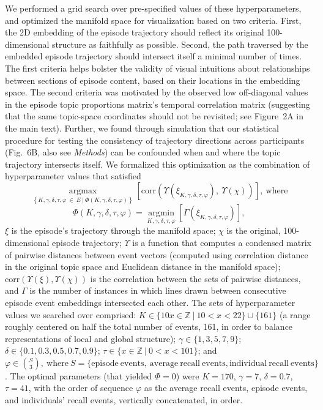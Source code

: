 \documentclass{article}
\newcommand{\argmax}{\mathop{\mathrm{argmax}}\limits}
\newcommand{\argmin}{\mathop{\mathrm{argmin}}\limits}
\newcommand{\topicprops}{2}
\newcommand{\trajectories}{6}
\begin{document}
We performed a grid search over pre-specified values of these hyperparameters, and optimized the manifold space for visualization based on two criteria. First, the 2D embedding of the episode trajectory should reflect its original 100-dimensional structure as faithfully as possible. Second, the path traversed by the embedded episode trajectory should intersect itself a minimal number of times.  The first criteria helps bolster the validity of visual intuitions about relationships between sections of episode content, based on their locations in the embedding space.  The second criteria was motivated by the observed low off-diagonal values in the episode topic proportions matrix's temporal correlation matrix (suggesting that the same topic-space coordinates should not be revisited; see Figure~\topicprops A in the main text).  Further, we found through simulation that our statistical procedure for testing the consistency of trajectory directions across participants (Fig.~\trajectories B, also see \textit{Methods}) can be confounded when and where the topic trajectory intersects itself.  We formalized this optimization as the combination of hyperparameter values that satisfied
\[
\argmax_{\left\{K, \gamma, \delta, \tau, \varphi~\in~E~\mathrm{|}~\Phi\left(K, \gamma, \delta, \tau, \varphi \right) \right\}} \left[\mathrm{corr}\left(\Upsilon\left(\xi_{K, \gamma, \delta, \tau, \varphi}\right),~\Upsilon\left(\chi\right)\right)\right],~\mathrm{where}
\]
\[
\Phi\left(K, \gamma, \delta, \tau, \varphi \right) = \argmin_{K, \gamma, \delta, \tau, \varphi} \left[\Gamma\left(\xi_{K, \gamma, \delta, \tau, \varphi}\right)\right],
\]
$\xi$ is the episode's trajectory through the manifold space; $\chi$ is the original, 100-dimensional episode trajectory; $\Upsilon$ is a function that computes a condensed matrix of pairwise distances between event vectors (computed using correlation distance in the original topic space and Euclidean distance in the manifold space); $\mathrm{corr}\left(\Upsilon\left(\xi\right), \Upsilon\left(\chi\right)\right)$ is the correlation between the sets of pairwise distances, and $\Gamma$ is the number of instances in which lines drawn between consecutive episode event embeddings intersected each other.   The sets of hyperparameter values we searched over comprised: $K \in \{10x \in \mathbb{Z}~|~10 < x <  22\} \cup \{161\}$ (a range roughly centered on half the total number of events, 161, in order to balance representations of local and global structure); $\gamma \in \{1, 3, 5, 7, 9\}$; $\delta \in \{0.1, 0.3, 0.5, 0.7, 0.9\}$; $\tau \in \{x \in \mathbb{Z}~|~0 < x < 101\}$; and $\varphi \in {S\choose3},~\mathrm{where}~S=\{\mathrm{episode~events,~average~recall~events, individual~recall~events}\}$.  The optimal parameters (that yielded $\Phi=0$) were $K=170$, $\gamma=7$, $\delta=0.7$, $\tau=41$, with the order of sequence $\varphi$ as the average recall events, episode events, and individuals' recall events, vertically concatenated, in order.
\end{document}
